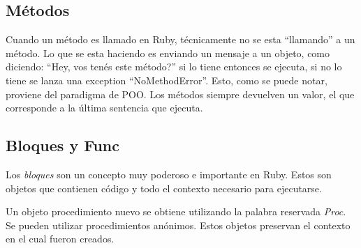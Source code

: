 \documentclass{article}
\begin{document}
 
\bigskip


\subsection{Métodos}

Cuando un método es llamado en Ruby, técnicamente no se esta “llamando” a un método. Lo que se esta haciendo es enviando un mensaje a un objeto, como diciendo: “Hey, vos tenés este método?” si lo tiene entonces se ejecuta, si no lo tiene se lanza una exception “NoMethodError”. Esto, como se puede notar, proviene del paradigma de POO.
Los métodos siempre devuelven un valor, el que corresponde a la última sentencia que ejecuta. 

 

 

 


\subsection{Bloques y Func}

Los \textit{bloques} son un concepto muy poderoso e importante en Ruby. Estos son objetos que contienen código y todo el contexto necesario para ejecutarse.

 
\bigskip

Un objeto procedimiento nuevo se obtiene utilizando la palabra reservada \textit{Proc}. Se pueden utilizar procedimientos anónimos. Estos objetos preservan el contexto en el cual fueron creados.

 

 

 
\end{document}
